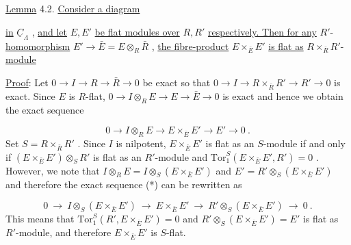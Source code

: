 \underline{Lemma} 4.2.  \underline{Consider a diagram}

\begin{center}
\end{center}
\underline{in}  $\underline{C}_\Lambda$ , \underline{and let}  $E, E'$  \underline{be flat modules over}  $R, R'$  \underline{respectively. Then for any} $R'$-\underline{homomorphism}  $E' \to \bar{E} = E \otimes_R \bar{R}$ , \underline{the fibre-product}  $E \times_{\bar{E}} E'$  \underline{is flat as} $R \times_{\bar{R}} R'$-\underline{module}



\underline{Proof}:  Let  $0 \to I \to R \to \bar{R} \to 0$  be exact so that  $0 \to I \to R \times_{\bar{R}} R' \to R' \to 0$  is exact. Since  $E$  is $R$-flat,  $0 \to I \otimes_R E \to E \to \bar{E} \to 0$  is exact and hence we obtain the exact sequence

\begin{equation}\tag{*}
0 \to I \otimes_R E \to E \times_{\bar{E}} E' \to E' \to 0 \ .
\end{equation}
Set  $S = R \times_{\bar{R}} R'$ . Since  $I$  is nilpotent,  $E \times_{\bar{E}} E'$  is flat as an $S$-module if and only if  $(E \times_{\bar{E}} E') \otimes_S R'$  is flat as an $R'$-module and  $\mathrm{Tor}_1^S (E \times_{\bar{E}} E', R') = 0$ . However, we note that  $I \otimes_R E = I \otimes_S (E \times_{\bar{E}} E')$  and  $E' = R' \otimes_S (E \times_{\bar{E}} E')$  and therefore the exact sequence (*) can be rewritten as

\begin{equation*}
0 \ \to \ I \otimes_S (E \times_{\bar{E}} E') \ \to \ E \times_{\bar{E}} E' \ \to \ R' \otimes_S (E \times_{\bar{E}} E') \ \to \ 0 \ .
\end{equation*}
This means that  $\mathrm{Tor}_1^S (R', E \times_{\bar{E}} E') = 0$  and  $R' \otimes_S (E \times_{\bar{E}} E') = E'$  is flat as $R'$-module, and therefore  $E \times_{\bar{E}} E'$  is $S$-flat.

